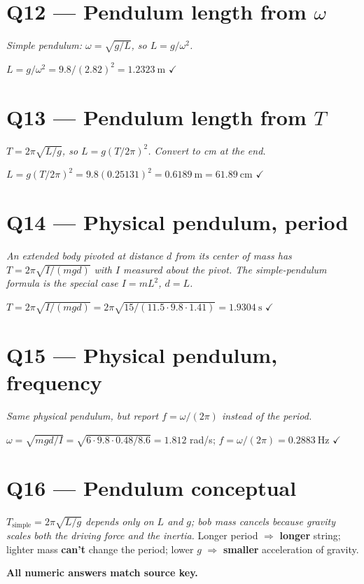 \documentclass[11pt]{article}
\newcommand{\checkmk}{\ensuremath{\checkmark}}
\begin{document}
\section*{Q12 --- Pendulum length from $\omega$}
\emph{Simple pendulum: $\omega = \sqrt{g/L}$, so $L = g/\omega^2$.}

$L = g/\omega^2 = 9.8/(2.82)^2 = \boxed{1.2323\ \text{m}}$ \checkmk

\section*{Q13 --- Pendulum length from $T$}
\emph{$T = 2\pi\sqrt{L/g}$, so $L = g(T/2\pi)^2$. Convert to cm at the end.}

$L = g(T/2\pi)^2 = 9.8(0.25131)^2 = 0.6189\ \text{m} = \boxed{61.89\ \text{cm}}$ \checkmk

\section*{Q14 --- Physical pendulum, period}
\emph{An extended body pivoted at distance $d$ from its center of mass has $T = 2\pi\sqrt{I/(mgd)}$ with $I$ measured about the pivot. The simple-pendulum formula is the special case $I = mL^2$, $d=L$.}

$T = 2\pi\sqrt{I/(mgd)} = 2\pi\sqrt{15/(11.5\cdot 9.8\cdot 1.41)} = \boxed{1.9304\ \text{s}}$ \checkmk

\section*{Q15 --- Physical pendulum, frequency}
\emph{Same physical pendulum, but report $f = \omega/(2\pi)$ instead of the period.}

$\omega = \sqrt{mgd/I} = \sqrt{6\cdot 9.8\cdot 0.48/8.6} = 1.812$ rad/s; $f = \omega/(2\pi) = \boxed{0.2883\ \text{Hz}}$ \checkmk

\section*{Q16 --- Pendulum conceptual}
\emph{$T_{\text{simple}} = 2\pi\sqrt{L/g}$ depends only on $L$ and $g$; bob mass cancels because gravity scales both the driving force and the inertia.} Longer period $\Rightarrow$ \textbf{longer} string; lighter mass \textbf{can't} change the period; lower $g$ $\Rightarrow$ \textbf{smaller} acceleration of gravity.

\bigskip\noindent\textbf{All numeric answers match source key.}
\end{document}
